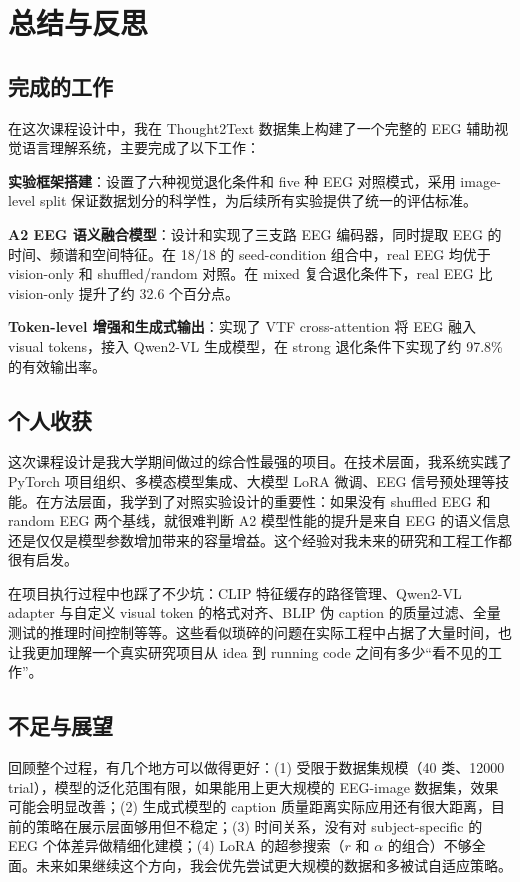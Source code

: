 \section{总结与反思}

\subsection{完成的工作}

在这次课程设计中，我在 Thought2Text 数据集上构建了一个完整的 EEG 辅助视觉语言理解系统，主要完成了以下工作：

\textbf{实验框架搭建}：设置了六种视觉退化条件和 five 种 EEG 对照模式，采用 image-level split 保证数据划分的科学性，为后续所有实验提供了统一的评估标准。

\textbf{A2 EEG 语义融合模型}：设计和实现了三支路 EEG 编码器，同时提取 EEG 的时间、频谱和空间特征。在 18/18 的 seed-condition 组合中，real EEG 均优于 vision-only 和 shuffled/random 对照。在 mixed 复合退化条件下，real EEG 比 vision-only 提升了约 32.6 个百分点。

\textbf{Token-level 增强和生成式输出}：实现了 VTF cross-attention 将 EEG 融入 visual tokens，接入 Qwen2-VL 生成模型，在 strong 退化条件下实现了约 97.8\% 的有效输出率。

\subsection{个人收获}

这次课程设计是我大学期间做过的综合性最强的项目。在技术层面，我系统实践了 PyTorch 项目组织、多模态模型集成、大模型 LoRA 微调、EEG 信号预处理等技能。在方法层面，我学到了对照实验设计的重要性：如果没有 shuffled EEG 和 random EEG 两个基线，就很难判断 A2 模型性能的提升是来自 EEG 的语义信息还是仅仅是模型参数增加带来的容量增益。这个经验对我未来的研究和工程工作都很有启发。

在项目执行过程中也踩了不少坑：CLIP 特征缓存的路径管理、Qwen2-VL adapter 与自定义 visual token 的格式对齐、BLIP 伪 caption 的质量过滤、全量测试的推理时间控制等等。这些看似琐碎的问题在实际工程中占据了大量时间，也让我更加理解一个真实研究项目从 idea 到 running code 之间有多少``看不见的工作''。

\subsection{不足与展望}

回顾整个过程，有几个地方可以做得更好：(1) 受限于数据集规模（40 类、12000 trial），模型的泛化范围有限，如果能用上更大规模的 EEG-image 数据集，效果可能会明显改善；(2) 生成式模型的 caption 质量距离实际应用还有很大距离，目前的策略在展示层面够用但不稳定；(3) 时间关系，没有对 subject-specific 的 EEG 个体差异做精细化建模；(4) LoRA 的超参搜索（$r$ 和 $\alpha$ 的组合）不够全面。未来如果继续这个方向，我会优先尝试更大规模的数据和多被试自适应策略。
